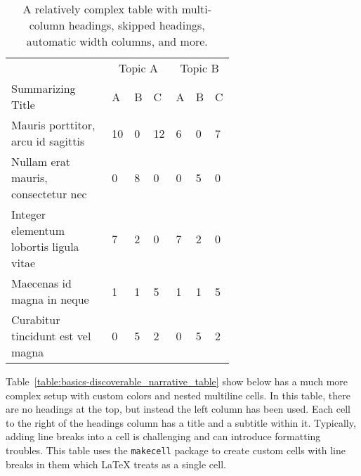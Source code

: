 \begin{table}[!htbp]
  \centering
  \caption{A relatively complex table with multi-column headings, skipped headings, automatic width columns, and more.}%
  \label{table:basics-table_1}
  

  \begin{tabularx}{\linewidth}{>{\raggedright\arraybackslash}p{0.63\linewidth} *3{X} | *3{X}}
    & \multicolumn{3}{c}{Topic A} & \multicolumn{3}{c}{Topic B}\\
    Summarizing Title & A & B & C & A & B & C\\
    \toprule
    
    Mauris porttitor, arcu id sagittis & 10 & 0 & 12 & 6 & 0 & 7\\
    Nullam erat mauris, consectetur nec & 0 & 8 & 0 & 0 & 5 & 0\\
    Integer elementum lobortis ligula vitae & 7 & 2 & 0 & 7 & 2 & 0\\
    Maecenas id magna in neque & 1 & 1 & 5 & 1 & 1 & 5\\
    Curabitur tincidunt est vel magna & 0 & 5 & 2 & 0 & 5 & 2
    \end{tabularx}
\end{table}

Table~\ref{table:basics-discoverable_narrative_table} show below has a much more complex setup with custom colors and nested multiline cells.
In this table, there are no headings at the top, but instead the left column has been used.
Each cell to the right of the headings column has a title and a subtitle within it.
Typically, adding line breaks into a cell is challenging and can introduce formatting troubles.
This table uses the \verb|makecell| package to create custom cells with line breaks in them which \LaTeX{} treats as a single cell.

